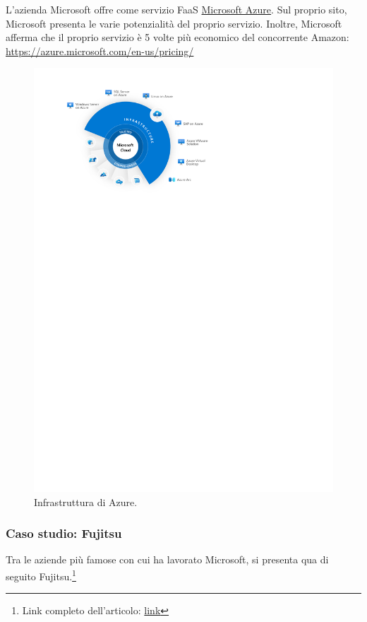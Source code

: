 \documentclass[a4paper]{article}
\begin{document}
	L'azienda Microsoft offre come servizio FaaS \href{https://azure.microsoft.com/en-us}{Microsoft Azure}. Sul proprio sito, Microsoft presenta le varie potenzialità del proprio servizio. Inoltre, Microsoft afferma che il proprio servizio è 5 volte più economico del concorrente Amazon: \url{https://azure.microsoft.com/en-us/pricing/}
	\begin{figure}[!htp]
		\centering
		\includegraphics[width=\textwidth]{img/Microsoft-1.pdf}
		\caption{Infrastruttura di Azure.}
	\end{figure}\newpage
	
	\subsubsection{Caso studio: Fujitsu}
	
	Tra le aziende più famose con cui ha lavorato Microsoft, si presenta qua di seguito Fujitsu.\footnote{Link completo dell'articolo: \href{https://customers.microsoft.com/en-GB/story/1533527200966057333-fujitsu-azure-partner-professional-services-business-critical}{link}}\newline
	
\end{document}
